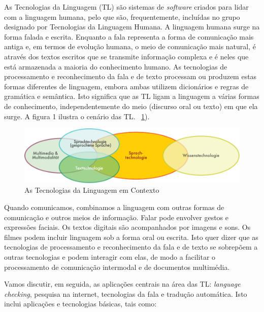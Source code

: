 \documentclass[]{../metanetpaper}
\begin{document}
\begin{multicols}{2}

  As Tecnologias da Linguagem (TL) são sistemas de \textit{software} criados para lidar com a linguagem humana, pelo que são, frequentemente, incluídas no grupo designado por Tecnologias da Linguagem Humana. A linguagem humana surge na forma falada e escrita. Enquanto a fala representa a forma de comunicação mais antiga e, em termos de evolução humana, o meio de comunicação mais natural, é através dos textos escritos que se transmite informação complexa e é neles que está armazenada a maioria do conhecimento humano. As tecnologias de processamento e reconhecimento da fala e de texto processam ou produzem estas formas diferentes de linguagem, embora ambas utilizem dicionários e regras de gramática e semântica. Isto significa que as TL ligam a linguagem a várias formas de conhecimento, independentemente do meio (discurso oral ou texto) em que ela surge. A figura 1 ilustra o cenário das TL. ~\ref{fig:ltincontext_de}).

\begin{figure}[htb]
  \center
  \includegraphics[width=\textwidth]{../_media/german/language_technologies}
  \caption{As Tecnologias da Linguagem em Contexto}
  \label{fig:ltincontext_de}
\end{figure}

Quando comunicamos, combinamos a linguagem com outras formas de comunicação e outros meios de informação. Falar pode envolver gestos e expressões faciais. Os textos digitais são acompanhados por imagens e sons. Os filmes podem incluir linguagem sob a forma oral ou escrita. Isto quer dizer que as tecnologias de processamento e reconhecimento da fala e de texto se sobrepõem a outras tecnologias e podem interagir com elas, de modo a facilitar o processamento de comunicação intermodal e de documentos multimédia.

Vamos discutir, em seguida, as aplicações centrais na área das TL: \textit{language checking}, pesquisa na internet, tecnologias da fala e tradução automática. Isto inclui aplicações e tecnologias básicas, tais como:


\end{multicols}
\end{document}
